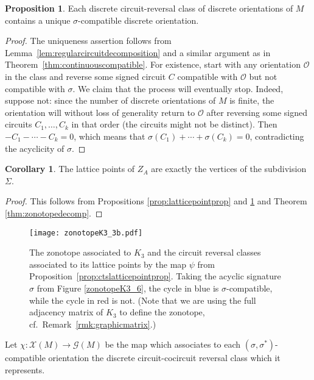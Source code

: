 \documentclass[12pt]{amsart}
\numberwithin{equation}{section}
\theoremstyle{definition}
\newtheorem{corollary}[theorem]{Corollary}
\newtheorem{proposition}[theorem]{Proposition}
\begin{document}
\begin{proposition} \label{prop:discretecompatible}
Each discrete circuit-reversal class of discrete orientations of $M$ contains a unique $\sigma$-compatible discrete orientation.
\end{proposition}

\begin{proof} The uniqueness assertion follows from Lemma~\ref{lem:regularcircuitdecomposition} and a similar argument as in Theorem~\ref{thm:continuouscompatible}. For existence, start with any orientation $\mathcal{O}$ in the class and reverse some signed circuit $C$ compatible with $\mathcal{O}$ but not compatible with $\sigma$. We claim that the process will eventually stop. Indeed, suppose not: since the number of discrete orientations of $M$ is finite, the orientation will without loss of generality return to $\mathcal{O}$ after reversing some signed circuits $C_1,\ldots,C_k$ in that order (the circuits might not be distinct). Then $-C_1-\cdots-C_k=0$, which means that $\sigma(C_1)+\cdots+\sigma(C_k)=0$, contradicting the acyclicity of $\sigma$. 
\end{proof}


\begin{corollary}
The lattice points of $Z_A$ are exactly the vertices of the subdivision $\Sigma$.
\end{corollary}

\begin{proof}
This follows from Propositions \ref{prop:latticepointprop} and \ref{prop:discretecompatible} and Theorem \ref{thm:zonotopedecomp}.  
\end{proof}

\begin{figure}[ht!]
\begin{center}
   \texttt{[image: zonotopeK3\_3b.pdf]}
\end{center}
  \caption{The zonotope associated to $K_3$ and the circuit reversal classes associated to its lattice points by the map $\psi$ from Proposition~\ref{prop:ctslatticepointprop}.  Taking the acyclic signature $\sigma$ from Figure \ref{zonotopeK3_6}, the cycle in blue is $\sigma$-compatible, while the cycle in red is not.  (Note that we are using the full adjacency matrix of $K_3$ to define the zonotope, cf.~Remark~\ref{rmk:graphicmatrix}.) 
  }
  \label{zonotopeK3_3}
\end{figure}

Let $\chi:{\mathcal X}(M) \rightarrow {\mathcal G}(M)$ be the map which associates to each $(\sigma,\sigma^*)$-compatible orientation the discrete circuit-cocircuit reversal class which it represents.
\end{document}

